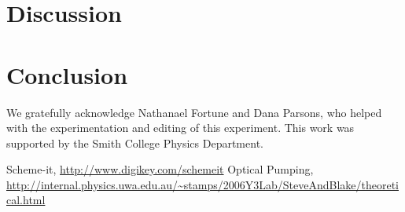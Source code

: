 \documentclass[prb,preprint]{revtex4-1}
\begin{document}
\section{Discussion}

\section{Conclusion}



\begin{acknowledgments}

We gratefully acknowledge Nathanael Fortune and Dana Parsons, who helped with the experimentation and editing of this experiment. This work was supported by the Smith College Physics Department.

\end{acknowledgments}


\begin{thebibliography}{99}

 Scheme-it, \url{http://www.digikey.com/schemeit}
 Optical Pumping, \url{http://internal.physics.uwa.edu.au/~stamps/2006Y3Lab/SteveAndBlake/theoretical.html}

\end{thebibliography}

\end{document}
